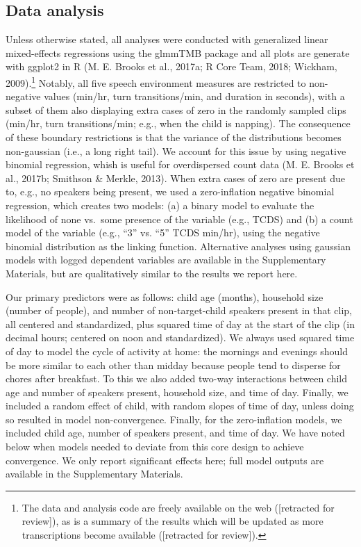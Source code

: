\documentclass[floatsintext,man]{apa6}
\theoremstyle{definition}
\theoremstyle{definition}
\theoremstyle{definition}
\theoremstyle{remark}
\begin{document}
\subsection{Data analysis}\label{data-analysis}

Unless otherwise stated, all analyses were conducted with generalized
linear mixed-effects regressions using the glmmTMB package and all plots
are generate with ggplot2 in R (M. E. Brooks et al., 2017a; R Core Team,
2018; Wickham, 2009).\footnote{The data and analysis code are freely
  available on the web ({[}retracted for review{]}), as is a summary of
  the results which will be updated as more transcriptions become
  available ({[}retracted for review{]}).} Notably, all five speech
environment measures are restricted to non-negative values (min/hr, turn
transitions/min, and duration in seconds), with a subset of them also
displaying extra cases of zero in the randomly sampled clips (min/hr,
turn transitions/min; e.g., when the child is napping). The consequence
of these boundary restrictions is that the variance of the distributions
becomes non-gaussian (i.e., a long right tail). We account for this
issue by using negative binomial regression, whish is useful for
overdispersed count data (M. E. Brooks et al., 2017b; Smithson \&
Merkle, 2013). When extra cases of zero are present due to, e.g., no
speakers being present, we used a zero-inflation negative binomial
regression, which creates two models: (a) a binary model to evaluate the
likelihood of none vs.~some presence of the variable (e.g., TCDS) and
(b) a count model of the variable (e.g., \enquote{3} vs. \enquote{5}
TCDS min/hr), using the negative binomial distribution as the linking
function. Alternative analyses using gaussian models with logged
dependent variables are available in the Supplementary Materials, but
are qualitatively similar to the results we report here.

Our primary predictors were as follows: child age (months), household
size (number of people), and number of non-target-child speakers present
in that clip, all centered and standardized, plus squared time of day at
the start of the clip (in decimal hours; centered on noon and
standardized). We always used squared time of day to model the cycle of
activity at home: the mornings and evenings should be more similar to
each other than midday because people tend to disperse for chores after
breakfast. To this we also added two-way interactions between child age
and number of speakers present, household size, and time of day.
Finally, we included a random effect of child, with random slopes of
time of day, unless doing so resulted in model non-convergence. Finally,
for the zero-inflation models, we included child age, number of speakers
present, and time of day. We have noted below when models needed to
deviate from this core design to achieve convergence. We only report
significant effects here; full model outputs are available in the
Supplementary Materials.
\end{document}
